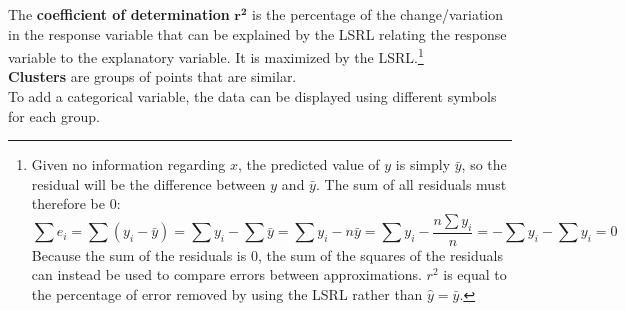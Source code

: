 \documentclass[../AP_Statistics.tex]{subfiles}
\begin{document}
			The \textbf{coefficient of determination} $\bm{r^2}$ is the percentage of the change/variation in the response variable that can be explained by the LSRL relating the response variable to the explanatory variable. It is maximized by the LSRL.\footnote{Given no information regarding $x$, the predicted value of $y$ is simply $\bar{y}$, so the residual will be the difference between $y$ and $\bar{y}$. The sum of all residuals must therefore be 0:\[\sum e_i = \sum(y_i - \bar{y}) = \sum y_i - \sum \bar{y} = \sum y_i - n\bar{y} = \sum y_i - \frac{n\sum 
			y_i}{n} = - \sum y_i - \sum y_i = 0\]Because the sum of the residuals is 0, the sum of the squares of the residuals can instead be used to compare errors between approximations. $r^2$ is equal to the percentage of error removed by using the LSRL rather than $\hat{y} = \bar{y}$.} \\
			\textbf{Clusters}  are groups of points that are similar. \\
			To add a categorical variable, the data can be displayed using different symbols for each group. \\
\end{document}
